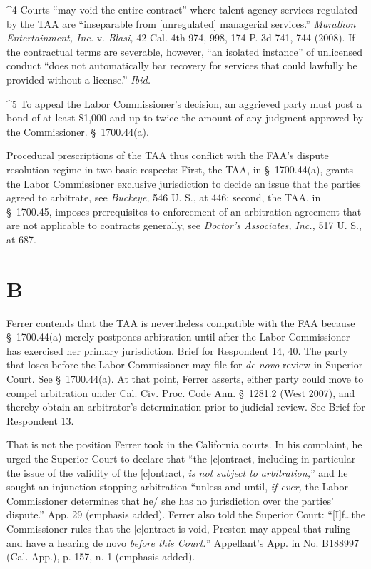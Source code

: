 ^4 Courts ``may void the entire contract'' where talent agency
services regulated by the TAA are ``inseparable from [unregulated]
managerial services.'' \emph{Marathon Entertainment, Inc.} v. \emph{Blasi,}
42 Cal. 4th 974, 998, 174 P. 3d 741, 744 (2008). If the contractual
terms are severable, however, ``an isolated instance'' of unlicensed
conduct ``does not automatically bar recovery for services that could
lawfully be provided without a license.'' \emph{Ibid.}

^5 To appeal the Labor Commissioner's decision, an aggrieved party
must post a bond of at least \$1,000 and up to twice the amount of any
judgment approved by the Commissioner. \S~1700.44(a).

  Procedural prescriptions of the TAA thus conflict with the FAA's
dispute resolution regime in two basic respects: First, the TAA, in
\S~1700.44(a), grants the Labor Commissioner exclusive jurisdiction
to decide an issue that the parties agreed to arbitrate, see
\emph{Buckeye,} 546 U. S., at 446; second, the TAA, in \S~1700.45,
imposes prerequisites to enforcement of an arbitration agreement
that are not applicable to contracts generally, see \emph{Doctor's
Associates, Inc.,} 517 U. S., at 687.

\section{B}

  Ferrer contends that the TAA is nevertheless compatible with the FAA
because \S~1700.44(a) merely postpones arbitration until after the
Labor Commissioner has exercised her primary jurisdiction. Brief
for Respondent 14, 40. The party that loses before the Labor
Commissioner may file for \emph{de novo} review in Superior Court. See
\S~1700.44(a). At that point, Ferrer asserts, either party could move
to compel arbitration under Cal. Civ. Proc. Code Ann. \S~1281.2 (West
2007), and thereby obtain an arbitrator's determination prior to
judicial review. See Brief for Respondent 13.

  That is not the position Ferrer took in the California courts. In his
complaint, he urged the Superior Court to \newpage  declare that ``the
[c]ontract, including in particular the issue of the validity of the
[c]ontract, \emph{is not subject to arbitration,}'' and he sought an
injunction stopping arbitration ``unless and until, \emph{if ever,} the
Labor Commissioner determines that he/ she has no jurisdiction over the
parties' dispute.'' App. 29 (emphasis added). Ferrer also told
the Superior Court: ``[I]f\dots the Commissioner rules that the
[c]ontract is void, Preston may appeal that ruling and have a hearing de
novo \emph{before this Court.}'' Appellant's App. in No. B188997 (Cal.
App.), p. 157, n. 1 (emphasis added).

